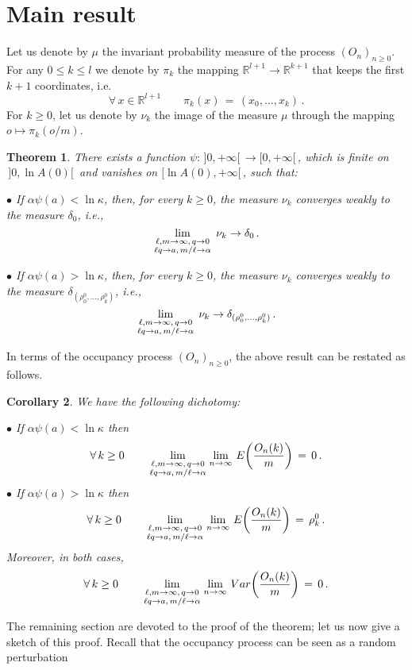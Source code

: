 \documentclass[a4paper,12pt]{article}
\newtheorem{theorem}{Theorem}[section]
\newtheorem{corollary}[theorem]{Corollary}
\theoremstyle{definition}
\theoremstyle{remark}
\def \cP {\mathcal{P}}
\def \a {\alpha}
\def \d {\delta}
\def \k {\kappa}
\def \R {\mathbb{R}}
\def \lra {\longrightarrow}
\def \Ot {(O_n)_{n\geq 0}}
\def \pml {\cP^m_{\ell +1}}
\def\lmq {{\genfrac{}{}{0pt}{1}{\ell,m\to\infty,\,q\to0}{\ell q\to a,\,m/\ell\to\a}}}
\begin{document}
\section{Main result}\label{result}
Let us denote by $\mu$ 
the invariant probability measure of the 
process $\Ot$.
For any $0\leq k\leq l$ we denote
by $\pi_k$ the mapping $\R^{l+1}\to\R^{k+1}$ that
keeps the first $k+1$ coordinates, i.e.
$$\forall\,x\in\R^{l+1}\qquad \pi_k(x)\,=\,(x_0,\dots,x_k)\,.$$
For $k\geq 0$,
let us denote by $\nu_k$ the image of the measure $\mu$ through 
the mapping $o\mapsto \pi_k(o/m)$.
%
\begin{theorem}\label{main}
There exists a function $\psi:\,]0,+\infty[\,\to[0,+\infty[\,$, which is finite on $\,]0,\ln A(0)[\,$ and vanishes
on $[\ln A(0),+\infty[\,$,
such that:

$\bullet$ If $\a\psi(a)<\ln\k$, then,
for every $k\geq 0$, the measure $\nu_k$
converges weakly to the measure $\d_0$, i.e.,
$$%
\lim_\lmq\,\nu_k\to\d_0\,.
$$

$\bullet$ If $\a\psi(a)>\ln\k$, then,
for every $k\geq0$,
the measure $\nu_k$ converges weakly to the measure $\d_{(\rho^0_0,\dots,\rho^0_k)}$, i.e.,
$$%
\lim_\lmq\,\nu_k\to\d_{(\rho^0_0,\dots,\rho^0_k)}\,.
$$
\end{theorem}
In terms of the occupancy process $\Ot$, 
the above result can be restated as follows.
\begin{corollary}
We have the following dichotomy:

$\bullet$ If $\a\psi(a)<\ln\k$ then
$$\forall\,k\geq0\qquad
\lim_\lmq\lim_{n\to\infty}\,
E\bigg(
\frac{O_n(k)}{m}
\bigg)\,=\,0\,.$$
$\bullet$ If $\a\psi(a)>\ln\k$ then
$$\forall\,k\geq0\qquad
\lim_\lmq\lim_{n\to\infty}\,
E\bigg(
\frac{O_n(k)}{m}
\bigg)\,=\,\rho^0_k\,.$$
Moreover, in both cases,
$$\forall\,k\geq0\qquad
\lim_\lmq\lim_{n\to\infty}\,
Var\bigg(
\frac{O_n(k)}{m}
\bigg)\,=\,0\,.
$$
\end{corollary}
The remaining section are devoted to the proof of the theorem;
let us now give a sketch of this proof.
Recall that the occupancy process can be seen as a random perturbation
\end{document}
